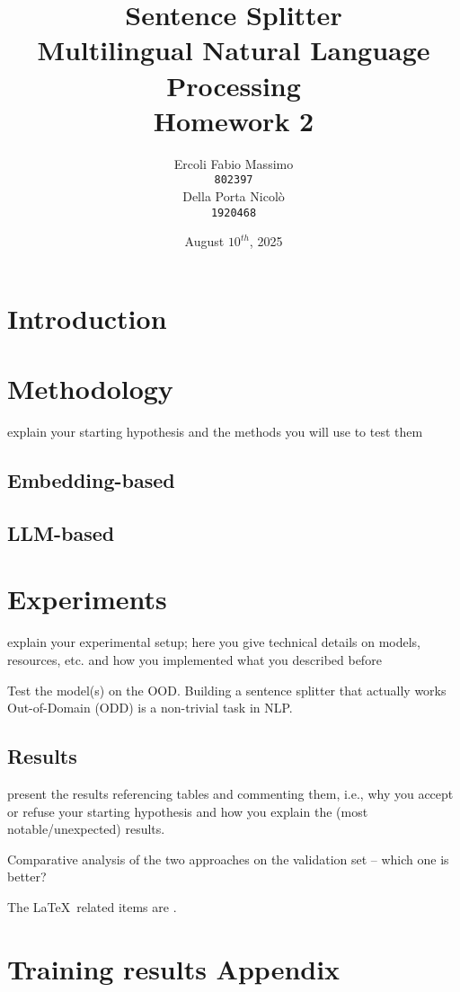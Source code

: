 \documentclass[11pt]{article}
\title{%
	Sentence Splitter\\
	\large Multilingual Natural Language Processing \\
	Homework 2}
\date{August $10^{th}$, 2025}
\author{Ercoli Fabio Massimo \\
\texttt{802397} \\\And
Della Porta Nicolò \\
\texttt{1920468} \\}
\begin{document}
\maketitle

\section{Introduction}

\section{Methodology}

explain your starting hypothesis and the methods you will use to test them

\subsection{Embedding-based}

\subsection{LLM-based}

\section{Experiments}

explain your experimental setup; here you give technical details on
models, resources, etc. and how you implemented what you described before

Test the model(s) on the OOD.
Building a sentence splitter that actually works Out-of-Domain (ODD) is a non-trivial task in NLP.

\subsection{Results}

present the results referencing tables and commenting them, i.e., why you
accept or refuse your starting hypothesis and how you explain the (most
notable/unexpected) results.

Comparative analysis of the two approaches on the validation set – which one is
better?

The \LaTeX\ related items are
\cite{andrew2007scalable}. 

\appendix
\section{Training results Appendix}
\label{sec:appendix1}


\end{document}
